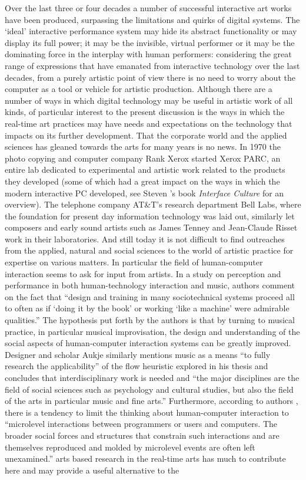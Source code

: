 Over the last three or four decades a number of successful interactive art works have been produced, surpassing the limitations and quirks of digital systems. The `ideal' interactive performance system may hide its abstract functionality or may display its full power; it may be the invisible, virtual performer or it may be the dominating force in the interplay with human performers: considering the great range of expressions that have emanated from interactive technology over the last decades, from a purely artistic point of view there is no need to worry about the computer as a tool or vehicle for artistic production. Although there are a number of ways in which digital technology may be useful in artistic work of all kinds, of particular interest to the present discussion is the ways in which the real-time art practices may have needs and expectations on the technology that impacts on its further development. That the corporate world and the applied sciences has gleaned towards the arts for many years is no news. In 1970 the photo copying and computer company Rank Xerox started Xerox PARC, an entire lab dedicated to experimental and artistic work related to the products they developed (some of which had a great impact on the ways in which the modern interactive PC developed, see Steven \citet{johnson97}'s book \emph{Interface Culture} for an overview). The telephone company AT\&T's research department Bell Labs, where the foundation for present day information technology was laid out, similarly let composers and early sound artists such as James Tenney and Jean-Claude Risset work in their laboratories. And still today it is not difficult to find outreaches from the applied, natural and social sciences to the world of artistic practice for expertise on various matters. In particular the field of human-computer interaction seems to ask for input from artists. In a study on perception and performance in both human-technology interaction and music, authors \citeauthor{kirlik04} comment on the fact that ``design and training in many sociotechnical systems proceed all to often as if `doing it by the book' or working `like a machine' were admirable qualities.'' The hypothesis put forth by the authors is that by turning to musical practice, in particular musical improvisation, the design and understanding of the social aspects of human-computer interaction systems can be greatly improved. Designer and scholar Aukje \citeauthor{thomassen03} similarly mentions music as a means ``to fully research the applicability'' of the flow heuristic explored in his thesis and concludes that interdisciplinary work is needed and ``the major disciplines are the field of social sciences such as psychology and cultural studies, but also the field of the arts in particular music and fine arts.'' \citep[239]{thomassen03} Furthermore, according to authors \citeauthor{engestrom96}, there is a tendency to limit the thinking about human-computer interaction to ``microlevel interactions between programmers or users and computers. The broader social forces and structures that constrain such interactions and are themselves reproduced and molded by microlevel events are often left unexamined.'' arts based research in the real-time arts has much to contribute here and may provide a useful alternative to the  